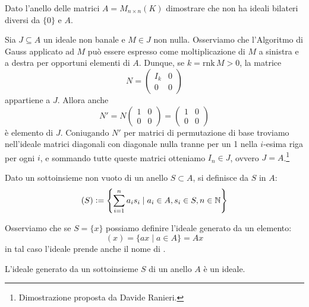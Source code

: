 \documentclass[11pt]{scrartcl}
\begin{document}
\begin{exercise}
    Dato l'anello delle matrici $A = M_{n \times n}(K)$ dimostrare che non ha ideali bilateri diversi da $\{0\}$ e $A$.
\end{exercise}

\begin{soln}
Sia $J\subseteq A$ un ideale non banale e $M\in J$ non nulla. Osserviamo che l'Algoritmo di Gauss applicato ad $M$ può essere espresso come moltiplicazione di $M$
a sinistra e a destra per opportuni elementi di $A$. Dunque, se $k=\mathrm{rnk}\, M>0$, la matrice 
\[ N=\left(\begin{array}{c|c}
    I_k & 0\\
    \hline
    0 & 0
\end{array}\right)
    \]
appartiene a $J$. Allora anche
\[
    N'=N\left(\begin{array}{c|c}
        1 & 0 \\
        \hline
        0 & 0
    \end{array}\right)
=\left(\begin{array}{c|c}
    1 & 0 \\
    \hline
    0 & 0
\end{array}\right)\]
è elemento di $J$. Coniugando $N'$ per matrici di permutazione di base troviamo nell'ideale matrici diagonali con diagonale nulla tranne per un 1
nella $i$-esima riga per ogni $i$, e sommando tutte queste matrici otteniamo $I_n\in J$, ovvero $J=A$.\footnote{Dimostrazione proposta da Davide Ranieri.}
\end{soln}

\begin{definition}
    Dato un sottoinsieme non vuoto di un anello $S \subset A$, si definisce  da $S$ in $A$:
        \[ (S) \vcentcolon =  \left\{\sum_{i = 1}^{n}a_is_i \mid a_i \in A, s_i \in S, n \in \mathbb N\right\}
            \]
\end{definition}

Osserviamo che se $S = \{x\}$ possiamo definire l'ideale generato da un elemento:
        \[ (x) = \{ax \mid a \in A\} = Ax
            \]
in tal caso l'ideale prende anche il nome di .
        
\begin{proposition}
    L'ideale generato da un sottoinsieme $S$ di un anello $A$ è un ideale.
\end{proposition}
\end{document}
